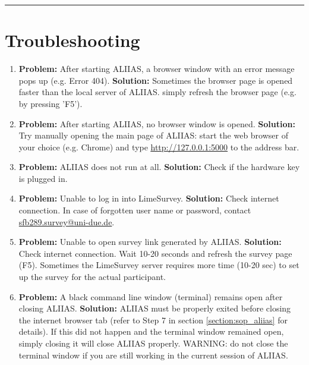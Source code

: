 \par\noindent\rule{\textwidth\color{pniblue}}{0.4pt}
\section{Troubleshooting}
\label{section:faq}

\begin{enumerate}

    \item \label{faq:err404} \textbf{Problem:}
    After starting ALIIAS, a browser window with an error message pops up (e.g. Error 404).
    \newline
    \textbf{Solution:}
    Sometimes the browser page is opened faster than the local server of ALIIAS. simply refresh the browser page (e.g. by pressing 'F5'). 
    
    \item \label{faq:nobrowser} \textbf{Problem:}
    After starting ALIIAS, no browser window is opened.
    \newline
    \textbf{Solution:}
    Try manually opening the main page of ALIIAS: start the web browser of your choice (e.g. Chrome) and type
    \href{http://127.0.0.1:5000}{\color{pniblue}\underline{http://127.0.0.1:5000}} to the address bar.
    
    \item \label{faq:nostart} \textbf{Problem:}
    ALIIAS does not run at all.
    \newline
    \textbf{Solution:}
    Check if the hardware key is plugged in. 
    
    \item \label{faq:ls_login} \textbf{Problem:}
    Unable to log in into LimeSurvey.
    \newline
    \textbf{Solution:}
    Check internet connection. In case of forgotten user name or password, contact \href{mailto:sfb289.survey@uni-due.de}{sfb289.survey@uni-due.de}.
    
    \item \label{faq:survey_link} \textbf{Problem:}
    Unable to open survey link generated by ALIIAS.
    \newline
    \textbf{Solution:}
    Check internet connection. Wait 10-20 seconds and refresh the survey page (F5). Sometimes the LimeSurvey server requires more time (10-20 sec) to set up the survey for the actual participant.
    
    
     \item \label{faq:exit} \textbf{Problem:}
    A black command line window (terminal) remains open after closing ALIIAS.
    \newline
    \textbf{Solution:}
    ALIIAS must be properly exited before closing the internet browser tab (refer to Step 7 in section \ref{section:sop_aliias} for details). If this did not happen and the terminal window remained open, simply closing it will close ALIIAS properly. WARNING: do not close the terminal window if you are still working in the current session of ALIIAS.
    

\end{enumerate}
